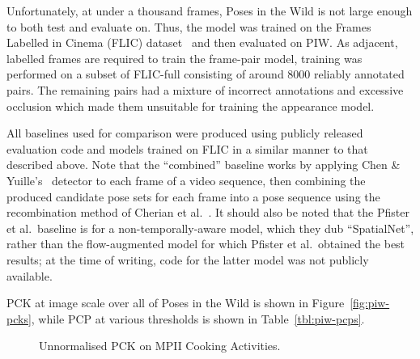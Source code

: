 \documentclass[runningheads]{llncs}
\begin{document}
Unfortunately, at under a thousand frames, Poses in the Wild is not large enough
to both test and evaluate on. Thus, the model was trained on the Frames Labelled
in Cinema (FLIC) dataset~\cite{sapp2013modec} and then evaluated on PIW\@. As
adjacent, labelled frames are required to train the frame-pair model, training
was performed on a subset of FLIC-full consisting of around 8000 reliably
annotated pairs. The remaining pairs had a mixture of incorrect annotations and
excessive occlusion which made them unsuitable for training the appearance
model.

All baselines used for comparison were produced using publicly released
evaluation code and models trained on FLIC in a similar manner to that described
above. Note that the ``combined'' baseline works by applying Chen \&
Yuille's~\cite{chen2014articulated} detector to each frame of a video sequence,
then combining the produced candidate pose sets for each frame into a pose
sequence using the recombination method of Cherian et
al.~\cite{cherian2014mixing}. It should also be noted that the Pfister et al.\
baseline is for a non-temporally-aware model, which they dub ``SpatialNet'',
rather than the flow-augmented model for which Pfister et al.\ obtained the best
results; at the time of writing, code for the latter model was not publicly
available.

PCK at image scale over all of Poses in the Wild is shown in
Figure~\ref{fig:piw-pcks}, while PCP at various thresholds is shown in
Table~\ref{tbl:piw-pcps}.

\begin{figure}[b]
\begin{center}

\end{center}
\vspace{-10mm}
\caption{Unnormalised PCK on MPII Cooking Activities.}
\label{fig:mpii-pcks}
\end{figure}
\end{document}
